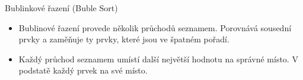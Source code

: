 \documentclass[11pt]{beamer}
\begin{document}
\begin{frame}{Bublinkové řazení (Buble Sort)}
    \begin{itemize}
        \item Bublinové řazení provede několik průchodů seznamem. Porovnává sousední prvky a zaměňuje ty prvky, které jsou ve špatném pořadí. 
        \item Každý průchod seznamem umístí další největší hodnotu na správné místo. V podstatě každý prvek  na své místo.
    \end{itemize}
    \begin{figure}
        \centering
        \label{fig:Buble_Sort}
    \end{figure}
\end{frame}
\end{document}
